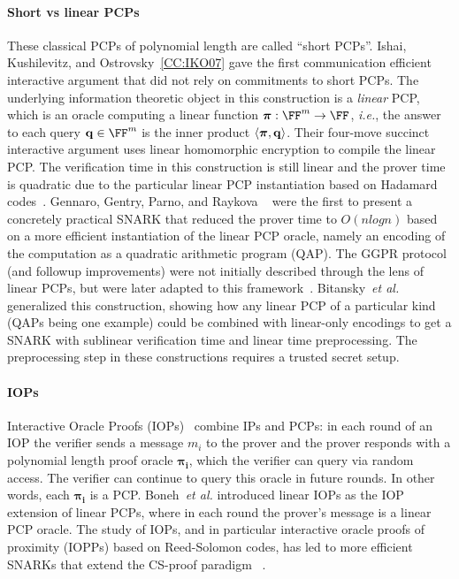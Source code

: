 \paragraph{Short vs linear PCPs} These classical PCPs of polynomial length are called ``short PCPs''. Ishai, Kushilevitz, and Ostrovsky~\ref{CC:IKO07} gave the first communication efficient interactive argument that did not rely on commitments to short PCPs. The underlying information theoretic object in this construction is a \emph{linear} PCP, which is an oracle computing a linear function $\proofO: \FF^m \rightarrow \FF$, \emph{i.e.}, the answer to each query $\mathbf{q} \in \FF^m$ is the inner product $\langle \boldsymbol{\pi}, \mathbf{q} \rangle$. Their four-move succinct interactive argument uses linear homomorphic encryption to compile the linear PCP. The verification time in this construction is still linear and the prover time is quadratic due to the particular linear PCP instantiation based on Hadamard codes~\cite{FOCS:ALMSS92}. Gennaro, Gentry, Parno, and Raykova ~\cite{EC:GGPR13} were the first to present a concretely practical SNARK that reduced the prover time to $O(n log n)$ based on a more efficient instantiation of the linear PCP oracle, namely an encoding of the computation as a quadratic arithmetic program (QAP). The GGPR protocol (and followup improvements) were not initially described through the lens of linear PCPs, but were later adapted to this framework~\cite{TCC:BCIOP13,ES:SBVBPW13}. Bitansky~\emph{et al.}~\cite{TCC:BCIOP13} generalized this construction, showing how any linear PCP of a particular kind (QAPs being one example) could be combined with linear-only encodings to get a SNARK with sublinear verification time and linear time preprocessing. The preprocessing step in these constructions requires a trusted secret setup. 

\paragraph{IOPs} Interactive Oracle Proofs (IOPs)~\cite{TCC:BenChiSpo16,STOC:ReiRotRot16} combine IPs and PCPs: in each round of an IOP the verifier sends a message $m_i$ to the prover and the prover responds with a polynomial length proof oracle $\boldsymbol{\pi_i}$, which the verifier can query via random access. The verifier can continue to query this oracle in future rounds. In other words, each $\boldsymbol{\pi_i}$ is a PCP. Boneh~\emph{et al.} \cite{C:BBCGI19} introduced linear IOPs as the IOP extension of linear PCPs, where in each round the prover's message is a linear PCP oracle. The study of IOPs, and in particular interactive oracle proofs of proximity (IOPPs) based on Reed-Solomon codes, has led to more efficient SNARKs that extend the CS-proof paradigm ~\cite{ICALP:BBHR18}.

